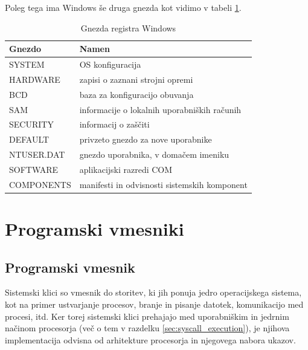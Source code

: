\documentclass[a4paper,12pt,openright]{book}
\begin{document}
Poleg tega ima Windows še druga gnezda kot vidimo v tabeli \ref{tab:windows_registry_hives}.

\begin{table}[h!]
	\begin{center}
		\begin{tabular}{ p{3.7cm}|p{8.8cm} }
			Gnezdo     & Namen                                         \\
			\hline
			SYSTEM     & OS konfiguracija                              \\
			HARDWARE   & zapisi o zaznani strojni opremi               \\
			BCD        & baza za konfiguracijo obuvanja                \\
			SAM        & informacije o lokalnih uporabniških računih \\
			SECURITY   & informacij o zaščiti                        \\
			DEFAULT    & privzeto gnezdo za nove uporabnike            \\
			NTUSER.DAT & gnezdo uporabnika, v domačem imeniku         \\
			SOFTWARE   & aplikacijski razredi COM                      \\
			COMPONENTS & manifesti in odvisnosti sistemskih komponent  \\
		\end{tabular}
	\end{center}
	\caption{Gnezda registra Windows \cite{Tanenbaum_Bos_2023}}
	\label{tab:windows_registry_hives}
\end{table}


\chapter{Programski vmesniki}


\section{Programski vmesnik} \label{sec:syscalls}

Sistemski klici so vmesnik do storitev, ki jih ponuja jedro operacijskega sistema, kot na primer ustvarjanje procesov, branje in pisanje datotek, komunikacijo med procesi, itd.
Ker torej sistemski klici prehajajo med uporabniškim in jedrnim načinom procesorja (več o tem v razdelku \ref{sec:syscall_execution}), je njihova implementacija odvisna od arhitekture procesorja in njegovega nabora ukazov.
\end{document}
